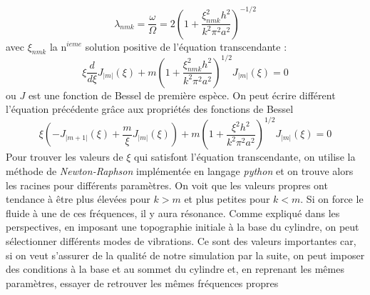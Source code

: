 \begin{equation}
    \lambda_{nmk} = \frac{\omega}{\Omega}=2 \left( 1 + \frac{\xi^2_{nmk}h^2}{k^2\pi^2 a^2}\right)^{-1/2}
\end{equation}
avec $\xi_{nmk}$ la n$^{ieme}$ solution positive de l'équation transcendante :
\begin{equation}
    \xi\frac{d}{d\xi}J_{\lvert m \rvert}(\xi) + m\left( 1 + \frac{\xi^2_{nmk} h^2}{k^2\pi^2 a^2}\right)^{1/2} J_{\lvert m \rvert}(\xi) = 0
\end{equation}
ou $J$ est une fonction de Bessel de première espèce. On peut écrire différent l'équation précédente grâce aux propriétés des fonctions de Bessel 
\begin{equation}
    \xi\left(-J_{\lvert m+1\rvert}(\xi) + \frac{m}{\xi}J_{\lvert m \rvert}(\xi)\right) + m\left( 1 + \frac{\xi^2 h^2}{k^2 \pi^2 a^2} \right)^{1/2}J_{\lvert m\rvert}(\xi) = 0
\end{equation}
Pour trouver les valeurs de $\xi$ qui satisfont l'équation transcendante, on utilise la méthode de \textit{Newton-Raphson} implémentée en langage \textit{python} et on trouve alors les racines pour différents paramètres.
\bigbreak
On voit que les valeurs propres ont tendance à être plus élevées pour $k>m$ et plus petites pour $k<m$. Si on force le fluide à une de ces fréquences, il y aura résonance. Comme expliqué dans les perspectives, en imposant une topographie initiale à la base du cylindre, on peut sélectionner différents modes de vibrations. Ce sont des valeurs importantes car, si on veut s'assurer de la qualité de notre simulation par la suite, on peut imposer des conditions à la base et au sommet du cylindre et, en reprenant les mêmes paramètres, essayer de retrouver les mêmes fréquences propres
